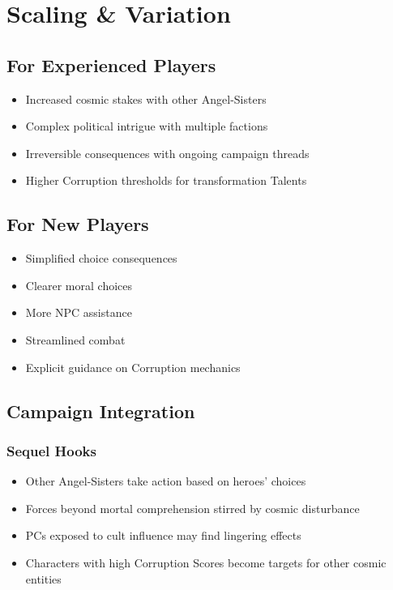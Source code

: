 \documentclass[11pt]{article}
\begin{document}
\newpage

\section{Scaling \& Variation}

\subsection{For Experienced Players}
\begin{itemize}[leftmargin=*]
    \item Increased cosmic stakes with other Angel-Sisters
    \item Complex political intrigue with multiple factions
    \item Irreversible consequences with ongoing campaign threads
    \item Higher Corruption thresholds for transformation Talents
\end{itemize}

\subsection{For New Players}
\begin{itemize}[leftmargin=*]
    \item Simplified choice consequences
    \item Clearer moral choices
    \item More NPC assistance
    \item Streamlined combat
    \item Explicit guidance on Corruption mechanics
\end{itemize}

\subsection{Campaign Integration}

\subsubsection{Sequel Hooks}
\begin{itemize}[leftmargin=*]
    \item Other Angel-Sisters take action based on heroes' choices
    \item Forces beyond mortal comprehension stirred by cosmic disturbance
    \item PCs exposed to cult influence may find lingering effects
    \item Characters with high Corruption Scores become targets for other cosmic entities
\end{itemize}
\end{document}
